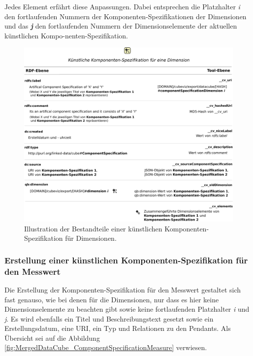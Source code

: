 \documentclass[11pt]{article}
\begin{document}
\noindent
Jedes Element erfährt diese Anpassungen. Dabei entsprechen die Platzhalter \emph{i} den fortlaufenden Nummern der Komponenten-Spezifikationen der Dimensionen und das \textbf{\emph{j}} den fortlaufenden Nummern der Dimensionselemente der aktuellen künstlichen Kompo-nenten-Spezifikation.

%
%
\begin{figure}[h!]
    \centering
    \includegraphics[width=15cm]{MergedDataCube/ComponentSpecificationDimension.pdf}
    \caption{Illustration der Bestandteile einer künstlichen Komponenten-Spezifikation für Dimensionen.}
    \label{fig:MergedDataCube_ComponentSpecificationDimension}
\end{figure}

%
%
\subsubsection{Erstellung einer künstlichen Komponenten-Spezifikation für den Messwert}

Die Erstellung der Komponenten-Spezifikation für den Messwert gestaltet sich fast genauso, wie bei denen für die Dimensionen, nur dass es hier keine Dimensionselemente zu beachten gibt sowie keine fortlaufenden Platzhalter \textit{i} und \textit{j}. Es wird ebenfalls ein Titel und Beschreibungstext gesetzt sowie ein Erstellungsdatum, eine URI, ein Typ und Relationen zu den Pendants. Als Übersicht sei auf die Abbildung \ref{fig:MergedDataCube_ComponentSpecificationMeasure} verwiesen.
\end{document}
